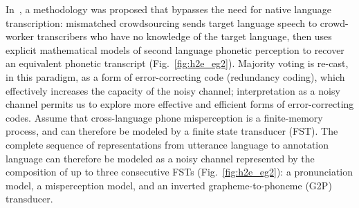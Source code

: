 In~\cite{JHJ15a}, a methodology was proposed that bypasses the need
for native language transcription: mismatched crowdsourcing sends target
language speech to crowd-worker transcribers who have no
knowledge of the target language, then uses explicit mathematical
models of second language phonetic perception to recover an equivalent
phonetic transcript (Fig.~\ref{fig:h2e_eg2}).  Majority voting is
re-cast, in this paradigm, as a form of error-correcting code
(redundancy coding), which effectively increases the capacity of the
noisy channel; interpretation as a noisy channel permits us to explore
more effective and efficient forms of error-correcting codes.
Assume that cross-language phone misperception is a finite-memory
process, and can therefore be modeled by a finite state transducer
(FST).  The complete sequence of representations from utterance
language to annotation language can therefore be modeled as a noisy
channel represented by the composition of up to three consecutive FSTs
(Fig.~\ref{fig:h2e_eg2}): a pronunciation model, a misperception
model, and an inverted grapheme-to-phoneme (G2P) transducer.

